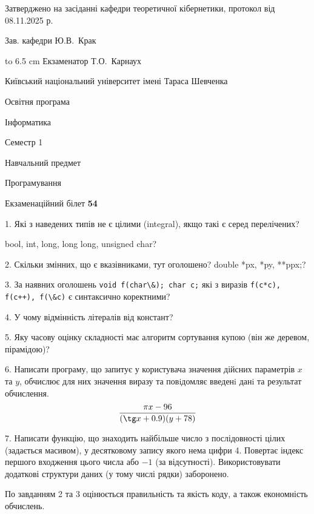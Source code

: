 \documentclass[12pt, ukrainian]{article}
\def\code#1{\Verb!#1!}
\begin{document}
{\smallskip\smallskip \begin {scriptsize} Затверджено на засіданні кафедри теоретичної кібернетики, протокол   від   08.11.2025 р.\par\smallskip\smallskip\smallskip\smallskip
{\parbox {6.5 cm} {Зав. кафедри \dotfill Ю.В.~Крак}}\hspace {0.7cm} {\hbox to 6.5 cm { Екзаменатор \dotfill Т.О.~Карнаух}} \end{scriptsize}}
\vspace{0.9cm}
{{\begin {scriptsize}\par
{ \center  Київський національний університет імені Тараса Шевченка \par}
{\parbox {5 cm}{Освітня програма \hfill}{\parbox {7 cm}{Інформатика\hfill}}\parbox {6 cm}{\hfill Семестр 1}}\par
{\parbox {5 cm} {Навчальний предмет \hfill}\parbox {7 cm}{Програмування \hfill}\parbox {6cm}{\hfill}\par}\vspace{-15pt} \end{scriptsize}}{\center Екзаменаційний білет \No \textbf { 54 }\par}}
{%
1. Які з наведених типів не є цілими (integral), якщо такі є серед перелічених?

bool, int, long, long long, unsigned char?
\par
\vspace{2mm}
2. Скільки змінних, що є вказівниками, тут оголошено?
double *px, *py, **ppx;?
\par
\vspace{2mm}
3. За наявних оголошень \code{void f(char\&); char c;} які з виразів \code{f(c*c), f(c++), f(\&c)} є синтаксично коректними?
\par
\vspace{2mm}
4. У чому відмінність літералів від констант?
\par
\vspace{2mm}
5. Яку часову оцінку складності має алгоритм сортування купою (він же деревом, пірамідою)?
\par
\vspace{2mm}
6. Написати програму, що запитує у користувача значення дійсних параметрів $x$ та $y$, обчислює для них значення виразу та повiдомляє введенi данi та результат обчислення.
$$\frac{\pi x - 96}{(\tg x + 0.9) (y + 78)}$$ 

\par
7. Написати функцію, що знаходить найбільше число з послідовності цілих (задається масивом), у десятковому запису якого нема цифри 4. Повертає індекс першого входження цього числа або $-1$ (за відсутності). Використовувати додаткові структури даних (у тому числі рядки) заборонено.

По завданням 2 та 3 оцінюється правильність та якість коду, а також економність обчислень.

}
\end{document}
